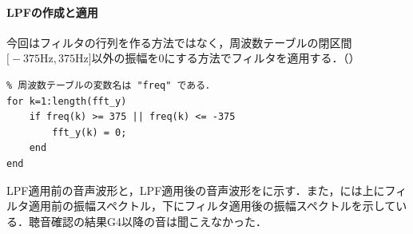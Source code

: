 \paragraph{LPFの作成と適用}
今回はフィルタの行列を作る方法ではなく，周波数テーブルの閉区間\(\big[-375\textrm{Hz},375\textrm{Hz}\big]\)以外の振幅を\(0\)にする方法でフィルタを適用する．（）
\begin{lstlisting}[caption={フィルターを適用する},label={src:フィルターを適用する},numbers={none}]
% データ列yをフーリエ変換後，Shiftしてabsをとったものを "fft_y" に格納している．
% 周波数テーブルの変数名は "freq" である．
for k=1:length(fft_y)
    if freq(k) >= 375 || freq(k) <= -375
        fft_y(k) = 0;
    end
end
\end{lstlisting}
\result
LPF適用前の音声波形と，LPF適用後の音声波形をに示す．また，には上にフィルタ適用前の振幅スペクトル，下にフィルタ適用後の振幅スペクトルを示している．聴音確認の結果G4以降の音は聞こえなかった．
